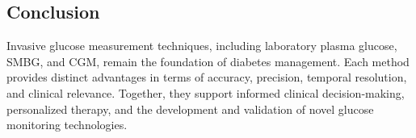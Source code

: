 \documentclass[12pt,a4paper]{article}
\begin{document}
\subsection{Conclusion}
Invasive glucose measurement techniques, including laboratory plasma glucose, SMBG, and CGM, remain the foundation of diabetes management. Each method provides distinct advantages in terms of accuracy, precision, temporal resolution, and clinical relevance. Together, they support informed clinical decision-making, personalized therapy, and the development and validation of novel glucose monitoring technologies.



\end{document}
